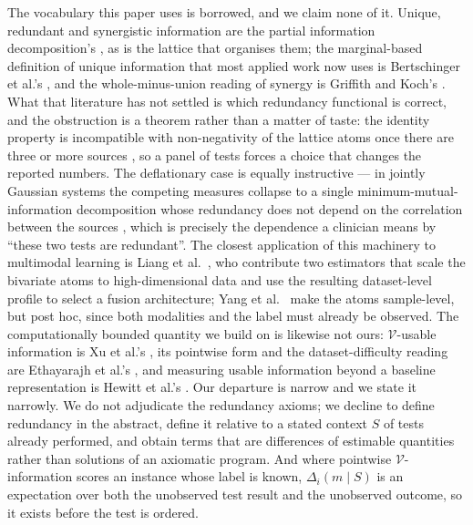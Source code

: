 \documentclass[11pt]{article}
\theoremstyle{definition}
\theoremstyle{remark}
\newcommand{\Vc}{\mathcal{V}}
\begin{document}
The vocabulary this paper uses is borrowed, and we claim none of it. Unique,
redundant and synergistic information are the partial information
decomposition's \citep{williams2010pid}, as is the lattice that organises them;
the marginal-based definition of unique information that most applied work now
uses is Bertschinger et al.'s \citep{bertschinger2014uniqueinfo}, and the
whole-minus-union reading of synergy is Griffith and Koch's
\citep{griffith2014synergy}. What that literature has not settled is which
redundancy functional is correct, and the obstruction is a theorem rather than a
matter of taste: the identity property is incompatible with non-negativity of the
lattice atoms once there are three or more sources \citep{rauh2014reconsidering},
so a panel of tests forces a choice that changes the reported numbers. The
deflationary case is equally instructive --- in jointly Gaussian systems the
competing measures collapse to a single minimum-mutual-information decomposition
whose redundancy does not depend on the correlation between the sources
\citep{barrett2015gaussian}, which is precisely the dependence a clinician means
by ``these two tests are redundant''. The closest application of this machinery
to multimodal learning is Liang et al.\ \citep{liang2023pid}, who contribute two
estimators that scale the bivariate atoms to high-dimensional data and use the
resulting dataset-level profile to select a fusion architecture; Yang et al.\
\citep{yang2025lsmi} make the atoms sample-level, but post hoc, since both
modalities and the label must already be observed. The computationally bounded
quantity we build on is likewise not ours: $\Vc$-usable information is Xu et al.'s
\citep{xu2020vinfo}, its pointwise form and the dataset-difficulty reading are
Ethayarajh et al.'s \citep{ethayarajh2022pvi}, and measuring usable information
beyond a baseline representation is Hewitt et al.'s \citep{hewitt2021conditional}.
Our departure is narrow and we state it narrowly. We do not adjudicate the
redundancy axioms; we decline to define redundancy in the abstract, define it
relative to a stated context $S$ of tests already performed, and obtain terms
that are differences of estimable quantities rather than solutions of an
axiomatic program. And where pointwise $\Vc$-information scores an instance whose
label is known, $\Delta_i(m\mid S)$ is an expectation over both the unobserved
test result and the unobserved outcome, so it exists before the test is ordered.
\end{document}
